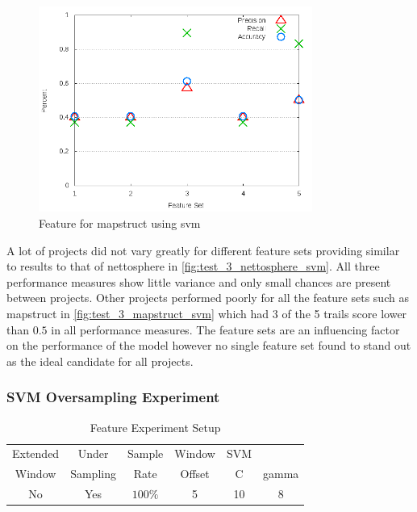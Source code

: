 \begin{figure}[!ht]
    \centering
        \includegraphics[width=0.8\textwidth]{images/svm/test_3/mapstruct_sample_range}
        \caption{Feature for mapstruct using \gls{svm}}
        \label{fig:test_3_mapstruct_svm}
\end{figure}

A lot of projects did not vary greatly for different feature sets providing similar to results to that of nettosphere in \autoref{fig:test_3_nettosphere_svm}. All three performance measures show little variance and only small chances are present between projects. Other projects performed poorly for all the feature sets such as mapstruct in \autoref{fig:test_3_mapstruct_svm} which had 3 of the 5 trails score lower than $0.5$ in all performance measures. The feature sets are an influencing factor on the performance of the model however no single feature set found to stand out as the ideal candidate for all projects.

\subsubsection{SVM Oversampling Experiment}
\label{sec:svm_os_experiment}

\begin{table}[h]
\begin{center}

    \begin{tabular}{|c|c|c|c|cc|}
        \hline
        Extended & Under & Sample & Window & SVM & \\
        Window & Sampling & Rate & Offset &  C & gamma \\ \hline
        No & Yes & $100\%$ & 5 & 10 & 8 \\ \hline
    \end{tabular}
    \caption{Feature Experiment Setup}
    \label{tab:rf_feature_experiment_3_setup}
\end{center}

\end{table}


